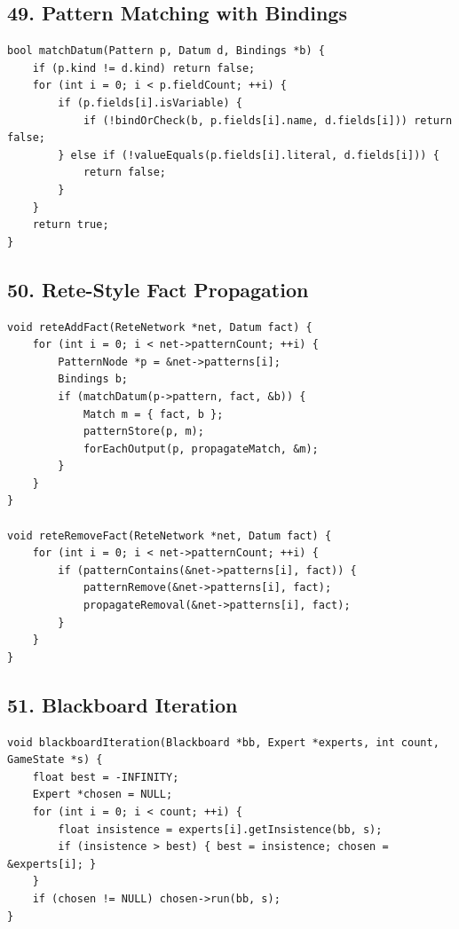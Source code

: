 \documentclass[10pt,letterpaper]{article}
\begin{document}
\subsection*{49. Pattern Matching with Bindings}
{}

\begin{verbatim}
bool matchDatum(Pattern p, Datum d, Bindings *b) {
    if (p.kind != d.kind) return false;
    for (int i = 0; i < p.fieldCount; ++i) {
        if (p.fields[i].isVariable) {
            if (!bindOrCheck(b, p.fields[i].name, d.fields[i])) return false;
        } else if (!valueEquals(p.fields[i].literal, d.fields[i])) {
            return false;
        }
    }
    return true;
}
\end{verbatim}

\subsection*{50. Rete-Style Fact Propagation}
{}

\begin{verbatim}
void reteAddFact(ReteNetwork *net, Datum fact) {
    for (int i = 0; i < net->patternCount; ++i) {
        PatternNode *p = &net->patterns[i];
        Bindings b;
        if (matchDatum(p->pattern, fact, &b)) {
            Match m = { fact, b };
            patternStore(p, m);
            forEachOutput(p, propagateMatch, &m);
        }
    }
}

void reteRemoveFact(ReteNetwork *net, Datum fact) {
    for (int i = 0; i < net->patternCount; ++i) {
        if (patternContains(&net->patterns[i], fact)) {
            patternRemove(&net->patterns[i], fact);
            propagateRemoval(&net->patterns[i], fact);
        }
    }
}
\end{verbatim}

\subsection*{51. Blackboard Iteration}
{}

\begin{verbatim}
void blackboardIteration(Blackboard *bb, Expert *experts, int count, GameState *s) {
    float best = -INFINITY;
    Expert *chosen = NULL;
    for (int i = 0; i < count; ++i) {
        float insistence = experts[i].getInsistence(bb, s);
        if (insistence > best) { best = insistence; chosen = &experts[i]; }
    }
    if (chosen != NULL) chosen->run(bb, s);
}
\end{verbatim}
\end{document}
